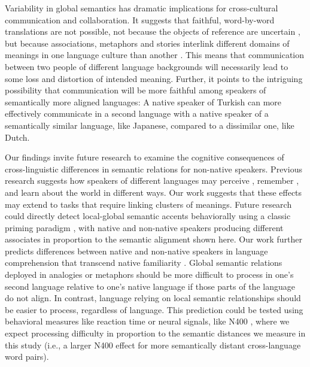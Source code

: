 \documentclass[9pt,twocolumn,twoside,lineno]{pnas-new}
\begin{document}
Variability in global semantics has dramatic implications for cross-cultural communication and collaboration. It suggests that faithful, word-by-word translations are not possible, not because the objects of reference are uncertain \cite{quine2013word}, but because associations, metaphors and stories interlink different domains of meanings in one language culture than another \cite{lakoff1987categories}. This means that communication between two people of different language backgrounds will necessarily lead to some loss and distortion of intended meaning.  Further, it points to the intriguing possibility that communication will be more faithful among speakers of semantically more aligned languages:  A native speaker of Turkish can more effectively communicate in a second language with a native speaker of a semantically similar language, like Japanese, compared to a dissimilar one, like Dutch. 

Our findings invite future research to examine the cognitive consequences of cross-linguistic differences in semantic relations for non-native speakers. Previous research suggests how speakers of different languages may perceive  \cite{winawer2007russian, boutonnet2015words}, remember \cite{loftus1974reconstruction, latourrette2020naming, frank2008number, majid2004can, levinson2003space, pavlenko2011thinking}, and learn \cite{lupyan2007language, zettersten2020finding} about the world in different ways. Our work suggests that these effects may extend to  tasks that require linking clusters of meanings.  Future research could directly detect local-global semantic accents behaviorally using a classic priming paradigm \cite{dong2005shared}, with native and non-native speakers producing different associates in proportion to the semantic alignment shown here. Our work further predicts differences between native and non-native speakers in language comprehension that transcend native familiarity \cite{hayakawa2018using, costa2014your, keysar2012foreign}. Global semantic relations deployed in analogies or metaphors should be more difficult to process in one's second language relative to one's native language if those parts of the language do not align. In contrast, language relying on local semantic relationships should be easier to process, regardless of language. This prediction could be tested using behavioral measures like reaction time or neural signals, like N400 \cite{kutas2011thirty}, where we expect processing difficulty in proportion to the semantic distances we measure in this study (i.e., a larger N400 effect for more semantically distant cross-language word pairs). 
\end{document}

